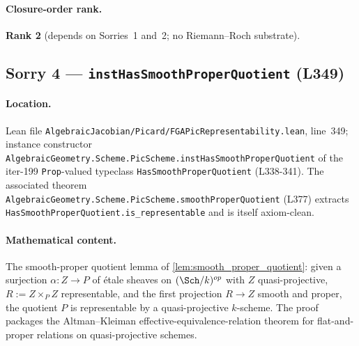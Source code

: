 \paragraph{Closure-order rank.} \textbf{Rank 2} (depends on Sorries~1
and~2; no Riemann--Roch substrate).

\subsection{Sorry 4 --- \texttt{instHasSmoothProperQuotient} (L349)}
\label{subsec:sorry_smooth_proper_quotient}

\paragraph{Location.} Lean file
\texttt{AlgebraicJacobian/Picard/FGAPicRepresentability.lean},
line~349; instance constructor
\texttt{AlgebraicGeometry.Scheme.PicScheme.instHasSmoothProperQuotient}
of the iter-199 \texttt{Prop}-valued typeclass
\texttt{HasSmoothProperQuotient} (L338-341). The associated theorem
\texttt{AlgebraicGeometry.Scheme.PicScheme.smoothProperQuotient}
(L377) extracts \texttt{HasSmoothProperQuotient.is\_representable}
and is itself axiom-clean.

\paragraph{Mathematical content.} The smooth-proper quotient lemma
of \cref{lem:smooth_proper_quotient}: given a surjection
$\alpha : Z \to P$ of \'etale sheaves on $(\Sch/k)^{op}$ with $Z$
quasi-projective, $R := Z \times_P Z$ representable, and the first
projection $R \to Z$ smooth and proper, the quotient $P$ is
representable by a quasi-projective $k$-scheme. The proof packages
the Altman--Kleiman effective-equivalence-relation theorem for
flat-and-proper relations on quasi-projective schemes.

